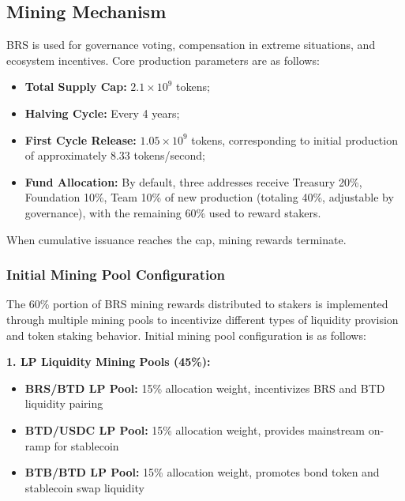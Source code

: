 \documentclass{article}
\begin{document}
\subsection{Mining Mechanism}
BRS is used for governance voting, compensation in extreme situations, and ecosystem incentives. Core production parameters are as follows:
\begin{itemize}
  \item \textbf{Total Supply Cap:} $2.1\times 10^9$ tokens;
  \item \textbf{Halving Cycle:} Every 4 years;
  \item \textbf{First Cycle Release:} $1.05\times 10^9$ tokens, corresponding to initial production of approximately $8.33$ tokens/second;
  \item \textbf{Fund Allocation:} By default, three addresses receive Treasury 20\%, Foundation 10\%, Team 10\% of new production (totaling 40\%, adjustable by governance), with the remaining 60\% used to reward stakers.
\end{itemize}
When cumulative issuance reaches the cap, mining rewards terminate.

\subsubsection{Initial Mining Pool Configuration}
The 60\% portion of BRS mining rewards distributed to stakers is implemented through multiple mining pools to incentivize different types of liquidity provision and token staking behavior. Initial mining pool configuration is as follows:

\textbf{1. LP Liquidity Mining Pools (45\%):}
\begin{itemize}
  \item \textbf{BRS/BTD LP Pool:} 15\% allocation weight, incentivizes BRS and BTD liquidity pairing
  \item \textbf{BTD/USDC LP Pool:} 15\% allocation weight, provides mainstream on-ramp for stablecoin
  \item \textbf{BTB/BTD LP Pool:} 15\% allocation weight, promotes bond token and stablecoin swap liquidity
\end{itemize}
\end{document}
